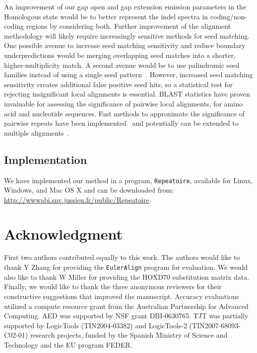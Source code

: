 \documentclass[12pt,journal,letterpaper,onecolumn, draftcls]{IEEEtran}
\begin{document}
An improvement of our gap open and gap extension emission parameters in the Homologous state would be to better represent the indel spectra in coding/non-coding regions by considering both. Further improvement of the alignment methodology will likely require increasingly sensitive methods for
seed matching. One possible avenue to increase seed matching sensitivity and reduce boundary underpredictions would be merging overlapping seed matches into a
shorter, higher-multiplicity match.  A second avenue would be to use palindromic seed families instead of using a single seed pattern~\cite{ref-pattern}. However, increased seed matching sensitivity creates additional
false positive seed hits, so a statistical test for rejecting
insignificant local alignments is essential.  BLAST statistics have proven
invaluable for assessing the significance of pairwise local alignments, for amino acid and nucleotide sequences.
Fast methods to approximate the significance of pairwise
repeats have been implemented~\cite{repseek} and potentially can be
extended to multiple alignments~\cite{ref-related1, Prakash2005}.

\subsection*{Implementation}
We have implemented our method in a program, \texttt{Repeatoire},
available for Linux, Windows, and Mac OS X and can be downloaded from:
\url{http://wwwabi.snv.jussieu.fr/public/Repeatoire}.

\section{ Acknowledgment }
First two authors contributed equally to this work. The authors would like to thank Y Zhang for providing the
\texttt{EulerAlign} program for evaluation. We would also like to thank
W Miller for providing the HOXD70 substitution matrix data.  Finally, we would like to thank the three anonymous reviewers for their constructive suggestions that improved the manuscript. Accuracy evaluations utilized a compute resource grant from the Australian
Partnership for Advanced Computing.  AED was supported by NSF grant
DBI-0630765. TJT was partially supported by LogicTools
(TIN2004-03382) and LogicTools-2 (TIN2007-68093-C02-01) research projects, funded by the Spanish Ministry of Science and
Technology and the EU program FEDER. 


\end{document}
